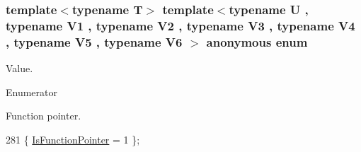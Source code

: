 \subsubsection[{\texorpdfstring{anonymous enum}{anonymous enum}}]{\setlength{\rightskip}{0pt plus 5cm}template$<$typename T$>$ template$<$typename U , typename V1 , typename V2 , typename V3 , typename V4 , typename V5 , typename V6 $>$ anonymous enum}\hypertarget{structTypeTraits_1_1FunctionPtrTraits_3_01U_07_5_08_07V1_00_01V2_00_01V3_00_01V4_00_01V5_00_01V6_08_4_ad474c051b68c1297ffc1840625b42f26}{}\label{structTypeTraits_1_1FunctionPtrTraits_3_01U_07_5_08_07V1_00_01V2_00_01V3_00_01V4_00_01V5_00_01V6_08_4_ad474c051b68c1297ffc1840625b42f26}
Value. \begin{Desc}
\item[Enumerator]\par
\begin{description}
\item[{\em 
Is\+Function\+Pointer\hypertarget{structTypeTraits_1_1FunctionPtrTraits_3_01U_07_5_08_07V1_00_01V2_00_01V3_00_01V4_00_01V5_00_01V6_08_4_ad474c051b68c1297ffc1840625b42f26aab29d768295c2ebf4b3c59cbe4060dda}{}\label{structTypeTraits_1_1FunctionPtrTraits_3_01U_07_5_08_07V1_00_01V2_00_01V3_00_01V4_00_01V5_00_01V6_08_4_ad474c051b68c1297ffc1840625b42f26aab29d768295c2ebf4b3c59cbe4060dda}
}]Function pointer. \end{description}
\end{Desc}

\begin{DoxyCode}
281 \{ \hyperlink{structTypeTraits_1_1FunctionPtrTraits_3_01U_07_5_08_07V1_00_01V2_00_01V3_00_01V4_00_01V5_00_01V6_08_4_ad474c051b68c1297ffc1840625b42f26aab29d768295c2ebf4b3c59cbe4060dda}{IsFunctionPointer} = 1    \};
\end{DoxyCode}

